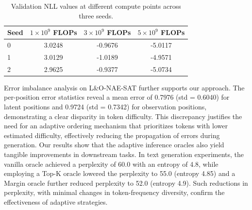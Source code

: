 \documentclass{article}
\begin{document}
\begin{table}[h]
\centering
\begin{tabular}{lccc}
\hline
Seed & \(1 \times 10^9\) FLOPs & \(3 \times 10^9\) FLOPs & \(5 \times 10^9\) FLOPs \\
\hline
0 & 3.0248 & -0.9676 & -5.0117 \\
1 & 3.0129 & -1.0189 & -4.9571 \\
2 & 2.9625 & -0.9377 & -5.0734 \\
\hline
\end{tabular}
\caption{Validation NLL values at different compute points across three seeds.}
\label{tab:scaling}
\end{table}

Error imbalance analysis on L\&O-NAE-SAT further supports our approach. The per-position error statistics reveal a mean error of 0.7976 (std = 0.6040) for latent positions and 0.9724 (std = 0.7342) for observation positions, demonstrating a clear disparity in token difficulty. This discrepancy justifies the need for an adaptive ordering mechanism that prioritizes tokens with lower estimated difficulty, effectively reducing the propagation of errors during generation. Our results show that the adaptive inference oracles also yield tangible improvements in downstream tasks. In text generation experiments, the vanilla oracle achieved a perplexity of 60.0 with an entropy of 4.8, while employing a Top-K oracle lowered the perplexity to 55.0 (entropy 4.85) and a Margin oracle further reduced perplexity to 52.0 (entropy 4.9). Such reductions in perplexity, with minimal changes in token-frequency diversity, confirm the effectiveness of adaptive strategies.
\end{document}
